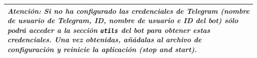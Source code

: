 \begin{tabular}{|p{15.5cm}|}
	
	\hline
	
	\textit{\textbf{Atención:} Si no ha configurado las credenciales de Telegram (nombre de usuario de Telegram, ID, nombre de usuario e ID del bot) sólo podrá acceder a la sección \texttt{utils} del bot para obtener estas credenciales. Una vez obtenidas, añádalas al archivo de configuración y reinicie la aplicación (stop and start).
	}
	\\
	\hline
	
\end{tabular}





